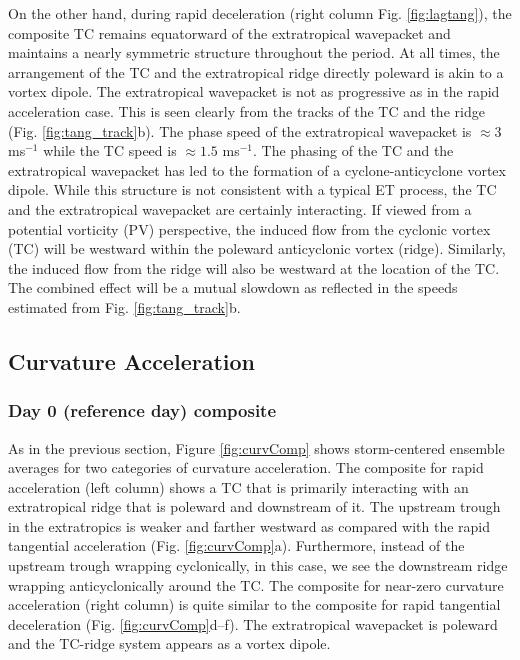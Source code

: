 \documentclass[wcd,manuscript]{copernicus}
\begin{document}
On the other hand, during rapid deceleration  (right column Fig. \ref{fig:lagtang}), the composite TC remains equatorward of the extratropical wavepacket and maintains a nearly symmetric structure throughout the period.  At all times, the arrangement of the TC and the extratropical ridge directly poleward is akin to a vortex dipole. The extratropical wavepacket is not as progressive as in the rapid acceleration case. This is seen clearly from the tracks of the TC and the ridge (Fig. \ref{fig:tang_track}b). The phase speed of the extratropical wavepacket is $\approx 3$ ms$^{-1}$ while the TC speed is $\approx 1.5$ ms$^{-1}$.  The phasing of the TC and the extratropical wavepacket has led to the formation of a cyclone-anticyclone vortex dipole. While this structure is not consistent with a typical ET process, the TC and the extratropical wavepacket are certainly interacting. If viewed from a potential vorticity (PV) perspective, the induced flow from the cyclonic vortex (TC) will be westward within the poleward anticyclonic vortex (ridge). Similarly, the induced flow from the ridge will also be westward at the location of the TC. The combined effect will be a mutual slowdown as reflected in the speeds estimated from Fig. \ref{fig:tang_track}b. 






\subsection{Curvature Acceleration}


\subsubsection{Day 0 (reference day) composite}

As in the  previous section, Figure \ref{fig:curvComp} shows storm-centered ensemble averages for two categories of curvature acceleration. The composite for rapid acceleration (left column) shows a TC that is primarily interacting with an extratropical ridge that is poleward and downstream of it. The upstream trough in the extratropics is weaker and farther westward as compared with the rapid tangential acceleration (Fig. \ref{fig:curvComp}a). Furthermore, instead of the upstream trough wrapping cyclonically, in this case,  we see the downstream ridge wrapping anticyclonically around the TC. The composite for near-zero curvature acceleration (right column) is quite similar to the composite for rapid tangential deceleration (Fig. \ref{fig:curvComp}d--f). The extratropical wavepacket is poleward and the TC-ridge system appears as a vortex dipole. 
\end{document}
